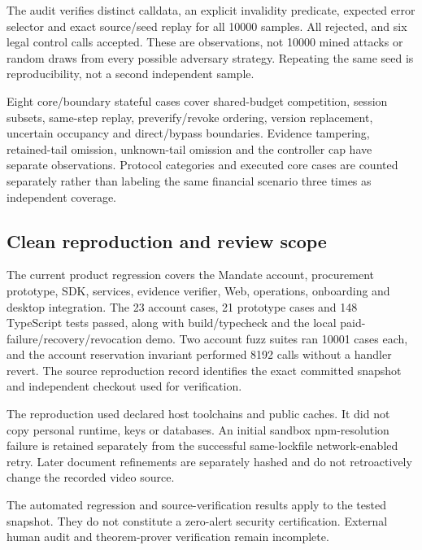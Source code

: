 The audit verifies distinct calldata, an explicit invalidity predicate, expected error selector and exact source/seed replay for all 10000 samples. All rejected, and six legal control calls accepted. These are  observations, not 10000 mined attacks or random draws from every possible adversary strategy. Repeating the same seed is reproducibility, not a second independent sample.

Eight core/boundary stateful cases cover shared-budget competition, session subsets, same-step replay, preverify/revoke ordering, version replacement, uncertain occupancy and direct/bypass boundaries. Evidence tampering, retained-tail omission, unknown-tail omission and the controller cap have separate observations. Protocol categories and executed core cases are counted separately rather than labeling the same financial scenario three times as independent coverage.

\subsection{Clean reproduction and review scope}
The current product regression covers the Mandate account, procurement prototype, SDK, services, evidence verifier, Web, operations, onboarding and desktop integration. The 23 account cases, 21 prototype cases and 148 TypeScript tests passed, along with build/typecheck and the local paid-failure/recovery/revocation demo. Two account fuzz suites ran 10001 cases each, and the account reservation invariant performed 8192 calls without a handler revert. The source reproduction record identifies the exact committed snapshot and independent checkout used for verification.\citep{repro}

The reproduction used declared host toolchains and public caches. It did not copy personal runtime, keys or databases. An initial sandbox npm-resolution failure is retained separately from the successful same-lockfile network-enabled retry. Later document refinements are separately hashed and do not retroactively change the recorded video source.

The automated regression and source-verification results apply to the tested snapshot. They do not constitute a zero-alert security certification. External human audit and theorem-prover verification remain incomplete.
